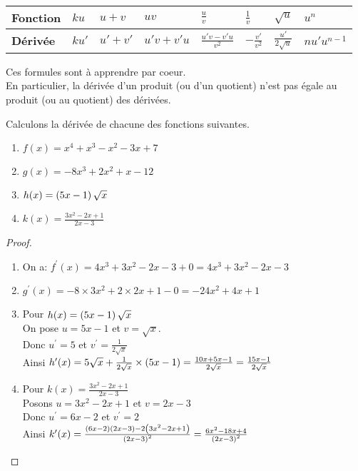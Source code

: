 \begin{tabularx}{\textwidth}{|X|X|X|X|X|X|X|X}
\hline 
\textbf{\color{blue}Fonction }& $ ku $ &$ u+v $ & $ uv $ & $\frac{u}{v}$ & $\frac{1}{v} $ & $ \sqrt{u} $ &  $ u^{n} $ \\     
\hline 
\textbf{\color{blue}Dérivée} & $ ku' $ & $ u'+v' $ & $u'v+ v'u  $ & $ \frac{u'v- v'u }{v^{2}} $ &  $- \frac{v'}{v^{2}} $ & $ \frac{u'}{2\sqrt{u}} $ & $ nu'u^{n-1} $  \\    
\hline
\end{tabularx}
\begin{remark} 
Ces formules  sont à apprendre par coeur. \\
En particulier, la dérivée d'un produit (ou d'un quotient) n'est pas égale au produit (ou au quotient) des dérivées.
\end{remark}


\begin{example}

Calculons la dérivée de chacune des  fonctions suivantes.


\begin{enumerate}
\item $ f(x)=x^{4} +x^{3}-x^{2}-3x+7$
\item $ g(x)=-8x^{3}+2x^{2} +x-12 $
\item $ h(x)=\left(5x-1\right)\sqrt{x} $
\item $ k(x)= \frac{3x^{2}-2x+1}{2x-3} $
\end{enumerate}



\end{example}


\begin{proof}
\begin{enumerate}
\item On a:\;  $ f^{\prime}(x)=4x^{3} +3x^{2}-2x-3 +0=4x^{3} +3x^{2}-2x-3$
\item $ g^{\prime}(x)=-8\times 3x^{2}+2\times2x +1-0 =-24x^{2}+4x +1$
\item   Pour $ h(x)=\left(5x-1\right)\sqrt{x} $\\
 On pose $ u= 5x-1$ \; et  \;$ v=\sqrt{x} $.\\
Donc $ u^{\prime}=5 $\; et\;  $ v^{\prime}= \frac{1}{2\sqrt{x}}$\\
Ainsi \; $ h^{\prime}(x)=5 \sqrt{x}+ \frac{1}{2\sqrt{x}}\times \left(5x-1\right)=\frac{10x+5x-1}{2\sqrt{x}}=\frac{15x-1}{2\sqrt{x}}$
\item  Pour $ k(x)= \frac{3x^{2}-2x+1}{2x-3} $\\
Posons $ u=3x^{2}-2x+1 $\; et \; $ v=2x-3 $\\
Donc  $ u^{\prime}=6x-2 $\; et \; $ v^{\prime}=2 $\\

Ainsi \; $ k^{\prime}(x)= \frac{\left(6x-2\right)\left(2x-3\right)-2\left(3x^{2}-2x+1\right)}{\left(2x-3\right)^{2}}=\frac{6x^{2}-18x+4}{\left(2x-3\right)^{2}}$
\end{enumerate}

\end{proof}

